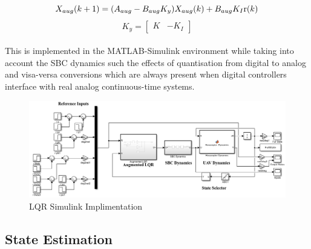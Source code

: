 \documentclass[12pt,a4paper,twoside]{report}
\begin{document}
				\begin{equation}
					X_{aug}(k+1) = (A_{aug} - B_{aug}K_{y}) X_{aug}(k) + B_{aug}K_I \emph{\emph{r}}(k)
				\end{equation}
				\[
					K_{y} =
					\begin{bmatrix}
						K & -K_{I}
					\end{bmatrix}
				\]
				\\
				This is implemented in the MATLAB-Simulink environment while taking into account the SBC dynamics such the effects of quantisation from digital to analog and visa-versa conversions which are always present when digital controllers interface with real analog continuous-time systems.
				\\
				\begin{figure}[h!]
					\centering
					\includegraphics[width=1\linewidth]{LQRSimulink.png}
					\caption{LQR Simulink Implimentation}
					\label{fig:lqrsimulinkimplimentation}
				\end{figure}
				
			\subsection{State Estimation}
			
\end{document}
